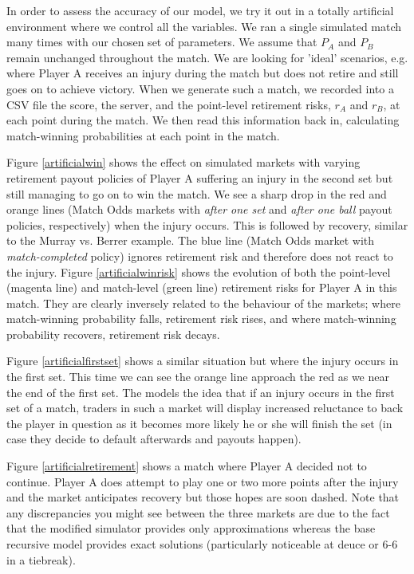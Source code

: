 \documentclass[letterpaper,12pt]{article}
\begin{document}
In order to assess the accuracy of our model, we try it out in a totally artificial environment where we control all the variables.  We ran a single simulated match many times with our chosen set of parameters.  We assume that $P_A$ and $P_B$ remain unchanged throughout the match.  We are looking for 'ideal' scenarios, e.g. where Player A receives an injury during the match but does not retire and still goes on to achieve victory.  When we generate such a match, we recorded into a CSV file the score, the server, and the point-level retirement risks, $r_A$ and $r_B$, at each point during the match.  We then read this information back in, calculating match-winning probabilities at each point in the match.

Figure \ref{artificialwin} shows the effect on simulated markets with varying retirement payout policies of Player A suffering an injury in the second set but still managing to go on to win the match.  We see a sharp drop in the red and orange lines (Match Odds markets with \textit{after one set} and \textit{after one ball} payout policies, respectively) when the injury occurs.  This is followed by recovery, similar to the Murray vs. Berrer example.  The blue line (Match Odds market with \textit{match-completed} policy) ignores retirement risk and therefore does not react to the injury.  Figure \ref{artificialwinrisk} shows the evolution of both the point-level (magenta line) and match-level (green line) retirement risks for Player A in this match.  They are clearly inversely related to the behaviour of the markets; where match-winning probability falls, retirement risk rises, and where match-winning probability recovers, retirement risk decays.

Figure \ref{artificialfirstset} shows a similar situation but where the injury occurs in the first set.  This time we can see the orange line approach the red as we near the end of the first set.  The models the idea that if an injury occurs in the first set of a match, traders in such a market will display increased reluctance to back the player in question as it becomes more likely he or she will finish the set (in case they decide to default afterwards and payouts happen).

Figure \ref{artificialretirement} shows a match where Player A decided not to continue.  Player A does attempt to play one or two more points after the injury and the market anticipates recovery but those hopes are soon dashed.  Note that any discrepancies you might see between the three markets are due to the fact that the modified simulator provides only approximations whereas the base recursive model provides exact solutions (particularly noticeable at deuce or 6-6 in a tiebreak).
\end{document}
